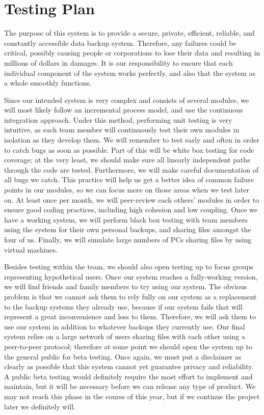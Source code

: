\chapter{Testing Plan}

The purpose of this system is to provide a secure, private, efficient, reliable, and constantly accessible data backup system.  Therefore, any failures could be critical, possibly causing people or corporations to lose their data and resulting in millions of dollars in damages.  It is our responsibility to ensure that each individual component of the system works perfectly, and also that the system as a whole smoothly functions.

Since our intended system is very complex and consists of several modules, we will most likely follow an incremental process model, and use the continuous integration approach.  Under this method, performing unit testing is very intuitive, as each team member will continuously test their own modules in isolation as they develop them.  We will remember to test early and often in order to catch bugs as soon as possible.  Part of this will be white box testing for code coverage; at the very least, we should make sure all  linearly independent paths through the code are tested.  Furthermore, we will make careful documentation of all bugs we catch.  This practice will help us get a better idea of common failure points in our modules, so we can focus more on those areas when we test later on.  At least once per month, we will peer-review each others' modules in order to ensure good coding practices, including high cohesion and low coupling.  Once we have a working system, we will perform black box testing with team members using the system for their own personal backups, and sharing files amongst the four of us.  Finally, we will simulate large numbers of PCs sharing files by using virtual machines.

Besides testing within the team, we should also open testing up to focus groups representing hypothetical users.  Once our system reaches a fully-working version, we will find friends and family members to try using our system.  The obvious problem is that we cannot ask them to rely fully on our system as a replacement to the backup systems they already use, because if our system fails that will represent a great inconvenience and loss to them.  Therefore, we will ask them to use our system in addition to whatever backups they currently use.  Our final system relies on a large network of users sharing files with each other using a peer-to-peer protocol; therefore at some point we should open the system up to the general public for beta testing.  Once again, we must put a disclaimer as clearly as possible that this system cannot yet guarantee privacy and reliability.  A public beta testing would definitely require the most effort to implement and maintain, but it will be necessary before we can release any type of product.  We may not reach this phase in the course of this year, but if we continue the project later we definitely will.